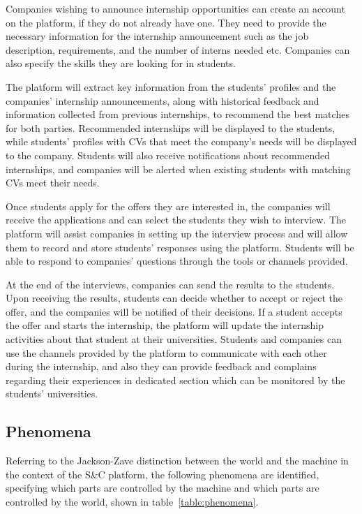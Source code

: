 Companies wishing to announce internship opportunities can create an account on the platform, if they do not already have one. They need to
provide the necessary information for the internship announcement such as the job description, requirements, and the number of interns needed etc. 
Companies can also specify the skills they are looking for in students.

The platform will extract key information from the students' profiles and the companies' internship announcements, along with historical feedback and 
information collected from previous internships, to recommend the best matches for both parties. Recommended internships will be displayed to the 
students, while students’ profiles with CVs that meet the company’s needs will be displayed to the company. Students will also receive notifications 
about recommended internships, and companies will be alerted when existing students with matching CVs meet their needs.

Once students apply for the offers they are interested in, the companies will receive the applications and can select the students they wish 
to interview. The platform will assist companies in setting up the interview process and will allow them to record and store students' responses 
using the platform. Students will be able to respond to companies' questions through the tools or channels provided.

At the end of the interviews, companies can send the results to the students. Upon receiving the results, students can decide whether to accept 
or reject the offer, and the companies will be notified of their decisions. If a student accepts the offer and starts the internship, the platform 
will update the internship activities about that student at their universities. Students and companies can use the channels provided by the platform to
communicate with each other during the internship, and also they can provide feedback and complains regarding their experiences in dedicated section
which can be monitored by the students' universities. 

\subsection{Phenomena}
Referring to the Jackson-Zave distinction between the world and the machine in the context of the S\&C platform, the following phenomena are 
identified, specifying which parts are controlled by the machine and which parts are controlled by the world, shown in table~\ref{table:phenomena}.

